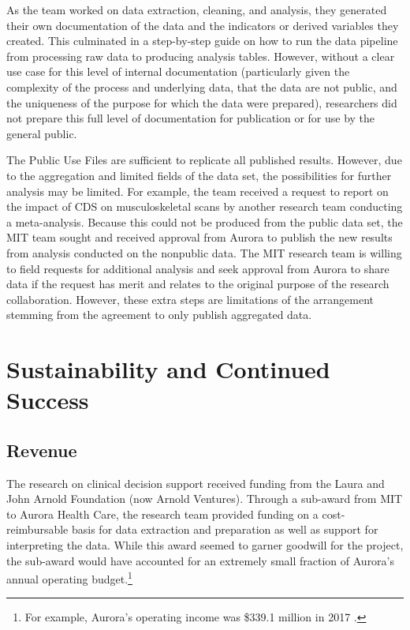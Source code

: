 \documentclass[
]{book}
\begin{document}
As the team worked on data extraction, cleaning, and analysis, they generated their own documentation of the data and the indicators or derived variables they created. This culminated in a step-by-step guide on how to run the data pipeline from processing raw data to producing analysis tables. However, without a clear use case for this level of internal documentation (particularly given the complexity of the process and underlying data, that the data are not public, and the uniqueness of the purpose for which the data were prepared), researchers did not prepare this full level of documentation for publication or for use by the general public.

The Public Use Files are sufficient to replicate all published results. However, due to the aggregation and limited fields of the data set, the possibilities for further analysis may be limited. For example, the team received a request to report on the impact of CDS on musculoskeletal scans by another research team conducting a meta-analysis. Because this could not be produced from the public data set, the MIT team sought and received approval from Aurora to publish the new results from analysis conducted on the nonpublic data. The MIT research team is willing to field requests for additional analysis and seek approval from Aurora to share data if the request has merit and relates to the original purpose of the research collaboration. However, these extra steps are limitations of the arrangement stemming from the agreement to only publish aggregated data.

\hypertarget{sustainability-and-continued-success-4}{%
\section{Sustainability and Continued Success}\label{sustainability-and-continued-success-4}}

\hypertarget{revenue-3}{%
\subsection{Revenue}\label{revenue-3}}

The research on clinical decision support received funding from the Laura and John Arnold Foundation (now Arnold Ventures). Through a sub-award from MIT to Aurora Health Care, the research team provided funding on a cost-reimbursable basis for data extraction and preparation as well as support for interpreting the data. While this award seemed to garner goodwill for the project, the sub-award would have accounted for an extremely small fraction of Aurora's annual operating budget.\footnote{For example, Aurora's operating income was \$339.1 million in 2017 \citep[see][]{aurorahealthcareinc.andaffiliates2018}.}
\end{document}
